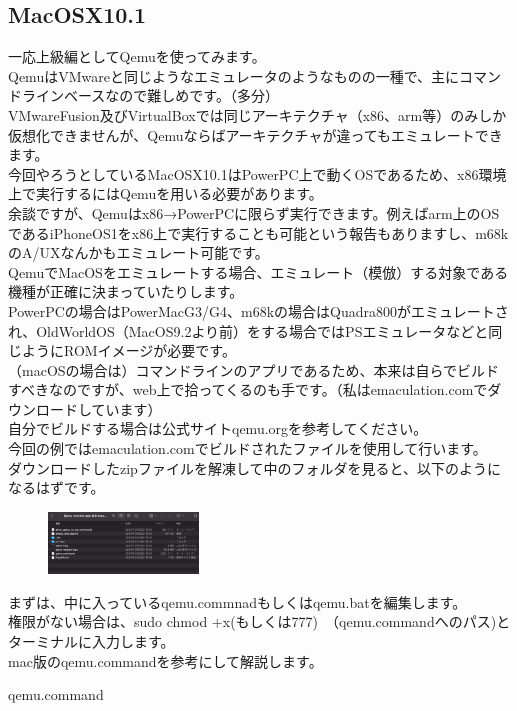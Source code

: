 \documentclass[b5paper,9pt,platex,dvipdfmx]{jsarticle}
\begin{document}
\begin{multicols*}{3}
{\subsection{MacOSX10.1}
一応上級編としてQemuを使ってみます。\\
QemuはVMwareと同じようなエミュレータのようなものの一種で、主にコマンドラインベースなので難しめです。（多分）\\
VMwareFusion及びVirtualBoxでは同じアーキテクチャ（x86、arm等）のみしか仮想化できませんが、Qemuならばアーキテクチャが違ってもエミュレートできます。\\
今回やろうとしているMacOSX10.1はPowerPC上で動くOSであるため、x86環境上で実行するにはQemuを用いる必要があります。\\
余談ですが、Qemuはx86→PowerPCに限らず実行できます。例えばarm上のOSであるiPhoneOS1をx86上で実行することも可能という報告もありますし、m68kのA/UXなんかもエミュレート可能です。\\
QemuでMacOSをエミュレートする場合、エミュレート（模倣）する対象である機種が正確に決まっていたりします。\\
PowerPCの場合はPowerMacG3/G4、m68kの場合はQuadra800がエミュレートされ、OldWorldOS（MacOS9.2より前）をする場合ではPSエミュレータなどと同じようにROMイメージが必要です。\\
（macOSの場合は）コマンドラインのアプリであるため、本来は自らでビルドすべきなのですが、web上で拾ってくるのも手です。（私はemaculation.comでダウンロードしています）\\
自分でビルドする場合は公式サイトqemu.orgを参考してください。\\
今回の例ではemaculation.comでビルドされたファイルを使用して行います。\\
ダウンロードしたzipファイルを解凍して中のフォルダを見ると、以下のようになるはずです。\\
\begin{figure}[H]
  \centering
  \includegraphics[width=4cm]{2.png}
  \caption{}
\end{figure}
まずは、中に入っているqemu.commnadもしくはqemu.batを編集します。\\
権限がない場合は、sudo chmod +x(もしくは777)　（qemu.commandへのパス)とターミナルに入力します。\\
mac版のqemu.commandを参考にして解説します。\\
\begin{itembox}{qemu.command}


\end{itembox}}
\end{multicols*}
\end{document}
